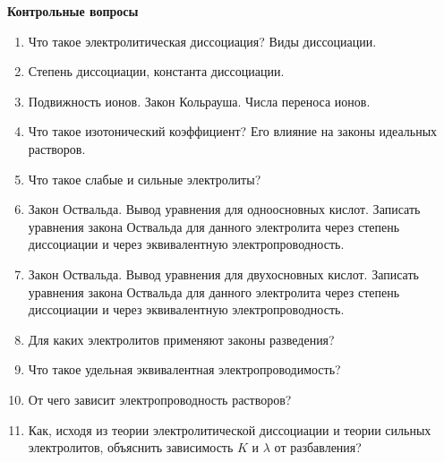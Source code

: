 \textbf{Контрольные вопросы}
\begin{enumerate}
\item Что такое электролитическая диссоциация? Виды диссоциации. 
\item Степень диссоциации, константа диссоциации.
\item Подвижность ионов. Закон Кольрауша. Числа переноса ионов.
\item Что такое изотонический коэффициент? Его влияние на законы идеальных растворов.
\item Что такое слабые и сильные электролиты?
\item Закон Оствальда. Вывод уравнения для одноосновных кислот. Записать уравнения закона Оствальда для данного электролита через степень диссоциации и через эквивалентную электропроводность.
\item Закон Оствальда. Вывод уравнения для двухосновных кислот. Записать уравнения закона Оствальда для данного электролита через степень диссоциации и через эквивалентную электропроводность.
\item Для каких электролитов применяют законы разведения?
\item Что такое удельная эквивалентная электропроводимость?
\item От чего зависит электропроводность растворов? 
\item Как, исходя из теории электролитической диссоциации и теории сильных  электролитов,  объяснить  зависимость $K$ и $\lambda$ от разбавления?
\end{enumerate}


